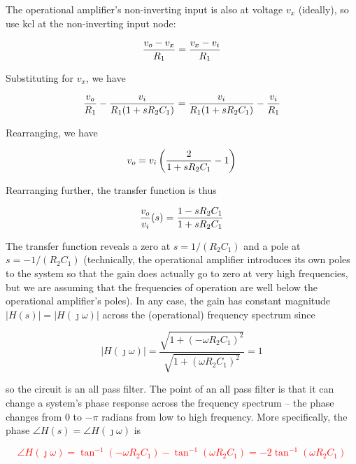 The operational amplifier's non-inverting input is also at voltage $v_x$ (ideally), so use \ac{kcl} at the non-inverting input node:

\begin{equation}
\frac{\vout-v_x}{R_1} = \frac{v_x - \vin}{R_1}
\end{equation}

Substituting for $v_{x}$, we have

\begin{equation}
\frac{\vout}{R_1}-\frac{\vin}{R_1(1+sR_2 C_1)} = \frac{\vin}{R_1(1+sR_2 C_1)}-\frac{\vin}{R_1}
\end{equation}

Rearranging, we have

\begin{equation}
\vout = \vin\left(\frac{2}{1+sR_2 C_1}-1\right)
\end{equation}

Rearranging further, the transfer function is thus

\textcolor{red}{
\begin{equation}
\frac{\vout}{\vin}(s) = \frac{1-sR_2 C_1}{1+sR_2 C_1}
\label{eq:1storderallpassfilter}
\end{equation}
}

The transfer function reveals a zero at $s = 1/(R_2 C_1)$ and a pole at $s = -1/(R_2 C_1)$ (technically, the operational amplifier introduces its own poles to the system so that the gain does actually go to zero at very high frequencies, but we are assuming that the frequencies of operation are well below the operational amplifier's poles).
In any case, the gain has constant magnitude $|H(s)| = |H(\jmath\omega)|$ across the (operational) frequency spectrum since

\begin{equation}
|H(\jmath\omega)| = \frac{\sqrt{1+(-\omega R_2 C_1)^2}}{\sqrt{1+(\omega R_2 C_1)^2}} = 1
\end{equation}

so the circuit is an all pass filter.
The point of an all pass filter is that it can change a system's phase response across the frequency spectrum -- the phase changes from $0$ to $-\pi$ radians from low to high frequency.
More specifically, the phase $\angle H(s) = \angle H(\jmath\omega)$ is

\textcolor{red}{
\begin{equation}
\angle H(\jmath\omega) = \tan^{-1}(-\omega R_2 C_1) - \tan^{-1}(\omega R_2 C_1) = -2\tan^{-1}(\omega R_2 C_1)
\label{eq:1storderallpassfilter_angle}
\end{equation}
}

